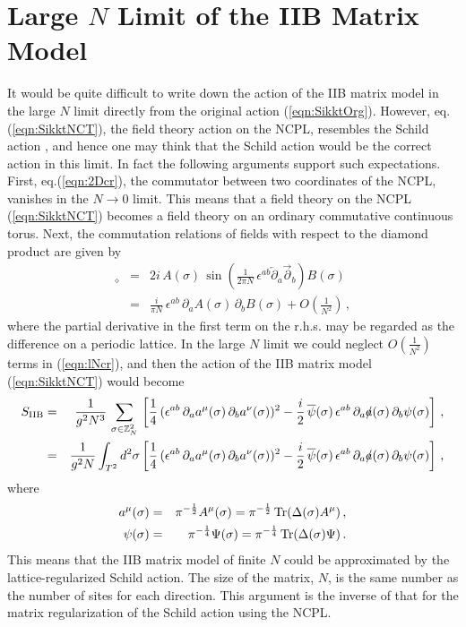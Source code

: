 \documentclass[12pt,a4paper]{article}
\newcommand{\Slash}[1]{\ooalign{\hfil/\hfil\crcr$#1$}}
\newcommand{\Integer}{\mathbb Z}
\newcommand{\Tr}{\mbox{\rm Tr}}
\begin{document}
\section{Large $N$ Limit of the IIB Matrix Model}\label{sec:LNIIB}
It would be quite difficult to write down the action of the IIB matrix
model in the large $N$ limit directly from the original action
(\ref{eqn:SikktOrg}).
However, eq. (\ref{eqn:SikktNCT}), the field theory action on the
NCPL, resembles the Schild action \cite{Schild}, and hence one may
think that the Schild action would be the correct action in this
limit.
In fact the following arguments support such expectations.
First, eq.(\ref{eqn:2Dcr}), the commutator between two coordinates of
the NCPL,  vanishes in the $N\rightarrow0$ limit.
This means that a field theory on the NCPL (\ref{eqn:SikktNCT})
becomes a field theory on an ordinary commutative continuous torus.
Next, the commutation relations of fields with respect to the diamond
product are given by
\begin{eqnarray}
  [A(\sigma),B(\sigma)]_\diamond&=&
	2i\,A(\sigma)\,\sin\left({\frac{1}{2\pi N}}\,\epsilon^{ab}
	{\overleftarrow\partial_a}{\overrightarrow\partial_b}\right)
	B(\sigma)\nonumber\\
   &=&{\frac{i}{\pi N}}\,\epsilon^{ab}\,\partial_a A(\sigma)\,
	\partial_b B(\sigma) +
	O\left(\frac{1}{N^2}\right)\,,\label{eqn:lNcr}
\end{eqnarray}
where the partial derivative in the first term on the r.h.s. may be
regarded as the difference on a periodic lattice.
In the large $N$ limit we could neglect $O(\frac{1}{N^2})$ terms in
(\ref{eqn:lNcr}), and then the action of the IIB matrix model
(\ref{eqn:SikktNCT}) would become
\begin{eqnarray}
    S_{\mbox{\scriptsize IIB}}&=&
    \frac{1}{g^2N^3}\,\sum_{\sigma\in\Integer^2_N}\,
    \left[\frac{1}{4}\,(\epsilon^{ab}\,\partial_aa^\mu (\sigma)\,
    \partial_ba^\nu(\sigma))^2 -\frac{i}{2}\,{\overline\psi}(\sigma)\,
    \epsilon^{ab}\,\partial_a{\Slash a}(\sigma)\,
    \partial_b\psi(\sigma)\right]\,,\label{eqn:Sikkt-sum}\\
  &=&\frac{1}{g^2 N} \int_{T^2}d^2\sigma \left[\frac{1}{4}\,
    (\epsilon^{ab}\,\partial_a a^\mu(\sigma)\,\partial_b
    a^\nu(\sigma))^2 -{\frac{i}{2}}\,{\overline\psi}(\sigma)\,
    \epsilon^{ab}\,\partial_a {\Slash a}(\sigma)\,
    \partial_b\psi(\sigma)\right]\,,\label{eqn:Sikkt}
\end{eqnarray}
where
\begin{eqnarray}
    a^\mu(\sigma)&=&\pi^{-\frac{1}{2}} A^\mu(\sigma)=
	\pi^{-\frac{1}{2}}\,\Tr(\Delta(\sigma)A^\mu)\,,\nonumber\\
    \psi(\sigma)&=&\pi^{-\frac{1}{4}}\Psi(\sigma)
	=\pi^{-\frac{1}{4}}\,\Tr(\Delta(\sigma)\Psi)\,.\label{eqn:IIBMtoF}
\end{eqnarray}
This means that the IIB matrix model of finite $N$ could be
approximated by the lattice-regularized Schild action.
The size of the matrix, $N$, is the same number as the number of sites
for each direction.
This argument is the inverse of that for the matrix regularization of
the Schild action \cite{Schild} using the NCPL.
\end{document}
